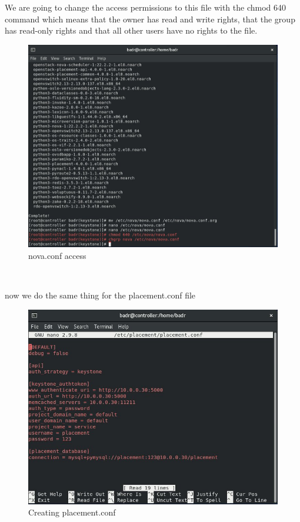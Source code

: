\begin{spacing}{1.2}
\par 
We are going to change the access permissions to this file with the chmod 640 command which means
that the owner has read and write rights, that the group has read-only rights and that
all other users have no rights to the file.
\\
\begin{figure}[!htb] 
\begin{center} 
\includegraphics[width=1\linewidth]{Cloud/Installing and Configuring Nova services/nova.conf access} 
\end{center} 
\caption{nova.conf access} 
\end{figure}  \FloatBarrier 
\\


\par now we do the same thing for the placement.conf file
\\
\begin{figure}[!htb] 
\begin{center} 
\includegraphics[width=1\linewidth]{Cloud/Installing and Configuring Nova services/Creating placement.conf} 
\end{center} 
\caption{Creating placement.conf} 
\end{figure}  \FloatBarrier 


\end{spacing}
